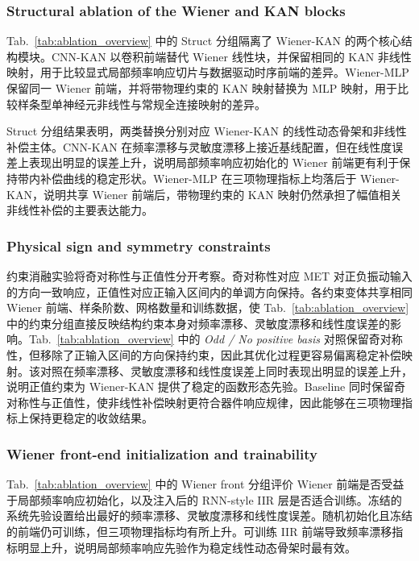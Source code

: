 \documentclass[sn-nature]{sn-jnl}
\begin{document}
\subsubsection{Structural ablation of the Wiener and KAN blocks}

Tab.~\ref{tab:ablation_overview} 中的 Struct 分组隔离了 Wiener-KAN 的两个核心结构模块。CNN-KAN 以卷积前端替代 Wiener 线性块，并保留相同的 KAN 非线性映射，用于比较显式局部频率响应切片与数据驱动时序前端的差异。Wiener-MLP 保留同一 Wiener 前端，并将带物理约束的 KAN 映射替换为 MLP 映射，用于比较样条型单神经元非线性与常规全连接映射的差异。

Struct 分组结果表明，两类替换分别对应 Wiener-KAN 的线性动态骨架和非线性补偿主体。CNN-KAN 在频率漂移与灵敏度漂移上接近基线配置，但在线性度误差上表现出明显的误差上升，说明局部频率响应初始化的 Wiener 前端更有利于保持带内补偿曲线的稳定形状。Wiener-MLP 在三项物理指标上均落后于 Wiener-KAN，说明共享 Wiener 前端后，带物理约束的 KAN 映射仍然承担了幅值相关非线性补偿的主要表达能力。


\subsubsection{Physical sign and symmetry constraints}

约束消融实验将奇对称性与正值性分开考察。奇对称性对应 MET 对正负振动输入的方向一致响应，正值性对应正输入区间内的单调方向保持。各约束变体共享相同 Wiener 前端、样条阶数、网格数量和训练数据，使 Tab.~\ref{tab:ablation_overview} 中的约束分组直接反映结构约束本身对频率漂移、灵敏度漂移和线性度误差的影响。Tab.~\ref{tab:ablation_overview} 中的 \textit{Odd / No positive basis} 对照保留奇对称性，但移除了正输入区间的方向保持约束，因此其优化过程更容易偏离稳定补偿映射。该对照在频率漂移、灵敏度漂移和线性度误差上同时表现出明显的误差上升，说明正值约束为 Wiener-KAN 提供了稳定的函数形态先验。Baseline 同时保留奇对称性与正值性，使非线性补偿映射更符合器件响应规律，因此能够在三项物理指标上保持更稳定的收敛结果。

\subsubsection{Wiener front-end initialization and trainability}

Tab.~\ref{tab:ablation_overview} 中的 Wiener front 分组评价 Wiener 前端是否受益于局部频率响应初始化，以及注入后的 RNN-style IIR 层是否适合训练。冻结的系统先验设置给出最好的频率漂移、灵敏度漂移和线性度误差。随机初始化且冻结的前端仍可训练，但三项物理指标均有所上升。可训练 IIR 前端导致频率漂移指标明显上升，说明局部频率响应先验作为稳定线性动态骨架时最有效。
\end{document}
